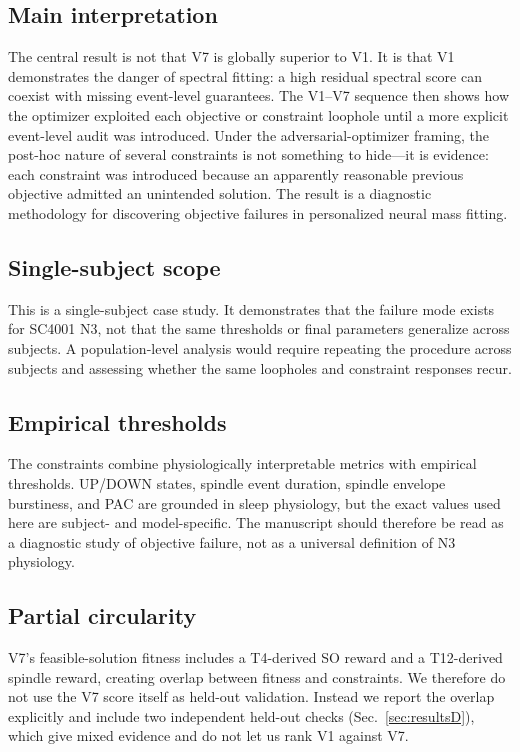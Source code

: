 \documentclass[conference]{IEEEtran}
\begin{document}
\subsection{Main interpretation}
The central result is not that V7 is globally superior to V1. It is that V1
demonstrates the danger of spectral fitting: a high residual spectral score can
coexist with missing event-level guarantees. The V1--V7 sequence then shows how
the optimizer exploited each objective or constraint loophole until a more
explicit event-level audit was introduced. Under the adversarial-optimizer
framing, the post-hoc nature of several constraints is not something to hide---it
is evidence: each constraint was introduced because an apparently reasonable
previous objective admitted an unintended solution. The result is a diagnostic
methodology for discovering objective failures in personalized neural mass
fitting.

\subsection{Single-subject scope}
This is a single-subject case study. It demonstrates that the failure mode
exists for SC4001 N3, not that the same thresholds or final parameters
generalize across subjects. A population-level analysis would require repeating
the procedure across subjects and assessing whether the same loopholes and
constraint responses recur.

\subsection{Empirical thresholds}
The constraints combine physiologically interpretable metrics with empirical
thresholds. UP/DOWN states, spindle event duration, spindle envelope
burstiness, and PAC are grounded in sleep physiology, but the exact values used
here are subject- and model-specific. The manuscript should therefore be read as
a diagnostic study of objective failure, not as a universal definition of N3
physiology.

\subsection{Partial circularity}
V7's feasible-solution fitness includes a T4-derived SO reward and a
T12-derived spindle reward, creating overlap between fitness and constraints. We
therefore do not use the V7 score itself as held-out validation. Instead we
report the overlap explicitly and include two independent held-out checks
(Sec.~\ref{sec:resultsD}), which give mixed evidence and do not let us rank V1
against V7.
\end{document}

